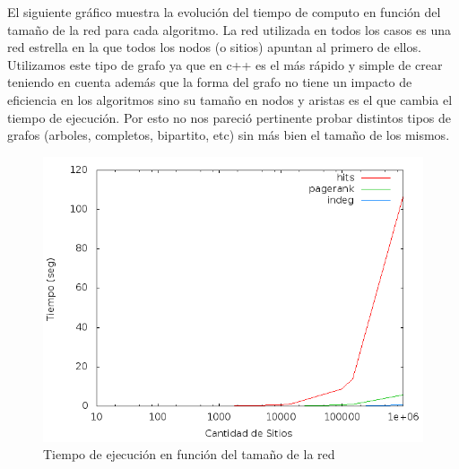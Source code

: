 El siguiente gráfico muestra la evolución del tiempo de computo en función del tamaño de la red para cada algoritmo. La red utilizada en todos los casos es una red estrella en la que todos los nodos (o sitios) apuntan al primero de ellos. Utilizamos este tipo de grafo ya que en c++ es el más rápido y simple de crear teniendo en cuenta además que la forma del grafo no tiene un impacto de eficiencia en los algoritmos sino su tamaño en nodos y aristas es el que cambia el tiempo de ejecución. Por esto no nos pareció pertinente probar distintos tipos de grafos (arboles, completos, bipartito, etc) sin más bien el tamaño de los mismos.

 \begin{figure}[!htb]
\begin{center}
    \includegraphics[scale=0.5]{imagenes/Tiempos.png}
    \caption{Tiempo de ejecución en función del tamaño de la red}
    \end{center}
\end{figure}



